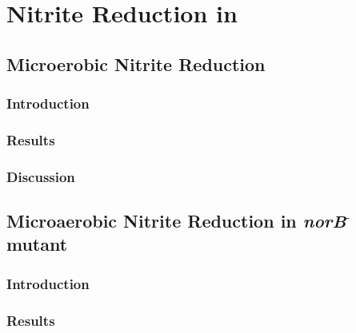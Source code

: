 \chapter{Nitrite Reduction in \Nm{}}
\label{chap:nitritereduction}


\section{Microerobic Nitrite Reduction}
\subsection{Introduction}
\subsection{Results}
\subsection{Discussion}
\section{\texorpdfstring{Microaerobic Nitrite Reduction in \textit{norB$^\textrm{-}$} mutant}{Microaerobic Nitrite Reduction in norB- mutant}}
\subsection{Introduction}
\subsection{Results}
